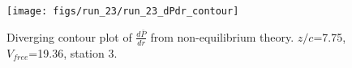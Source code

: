 \begin{figure}[H]
\centering
\texttt{[image: figs/run\_23/run\_23\_dPdr\_contour]}
\caption{Diverging contour plot of $\frac{d\bar{P}}{dr}$ from non-equilibrium theory. $z/c$=7.75, $V_{free}$=19.36, station 3.}
\label{fig:run_23_dPdr_contour}
\end{figure}


